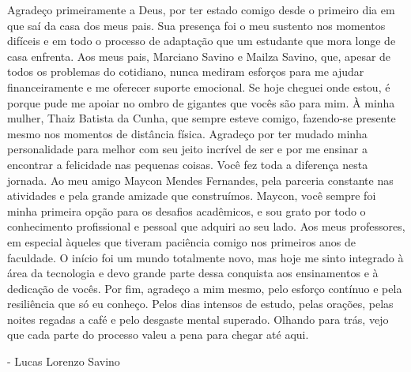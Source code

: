 
\begin{agradecimentos}

Agradeço primeiramente a Deus, por ter estado comigo desde o primeiro dia em que saí da casa dos meus pais. Sua presença foi o meu sustento nos momentos difíceis e em todo o processo de adaptação que um estudante que mora longe de casa enfrenta.
Aos meus pais, Marciano Savino e Mailza Savino, que, apesar de todos os problemas do cotidiano, nunca mediram esforços para me ajudar financeiramente e me oferecer suporte emocional. Se hoje cheguei onde estou, é porque pude me apoiar no ombro de gigantes que vocês são para mim.
À minha mulher, Thaiz Batista da Cunha, que sempre esteve comigo, fazendo-se presente mesmo nos momentos de distância física. Agradeço por ter mudado minha personalidade para melhor com seu jeito incrível de ser e por me ensinar a encontrar a felicidade nas pequenas coisas. Você fez toda a diferença nesta jornada.
Ao meu amigo Maycon Mendes Fernandes, pela parceria constante nas atividades e pela grande amizade que construímos. Maycon, você sempre foi minha primeira opção para os desafios acadêmicos, e sou grato por todo o conhecimento profissional e pessoal que adquiri ao seu lado.
Aos meus professores, em especial àqueles que tiveram paciência comigo nos primeiros anos de faculdade. O início foi um mundo totalmente novo, mas hoje me sinto integrado à área da tecnologia e devo grande parte dessa conquista aos ensinamentos e à dedicação de vocês.
Por fim, agradeço a mim mesmo, pelo esforço contínuo e pela resiliência que só eu conheço. Pelos dias intensos de estudo, pelas orações, pelas noites regadas a café e pelo desgaste mental superado. Olhando para trás, vejo que cada parte do processo valeu a pena para chegar até aqui.
\begin{flushright}
- Lucas Lorenzo Savino
\end{flushright}


\end{agradecimentos}
